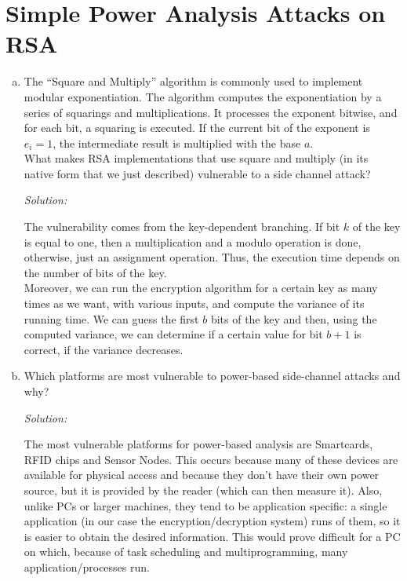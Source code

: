 \documentclass[a4paper,11pt]{article}
\newcommand{\includeonlyinsolution}[1]{\ifsolution#1\fi}
\newenvironment{solution}%
{\par{\noindent\small\textit{Solution:}}\vspace{-12pt}\begin{framed}}%
{\end{framed}\par}
\begin{document}
\section{Simple Power Analysis Attacks on RSA}
\begin{enumerate}[(a)]

\item The ``Square and Multiply'' algorithm is commonly used to implement
  modular exponentiation. The algorithm computes the exponentiation by a
  series of squarings and multiplications. It processes the exponent bitwise,
  and for each bit, a squaring is executed. If the current bit of the exponent
  is $e_i=1$, the intermediate result is multiplied with the base $a$. \\
  What makes RSA implementations that use square and multiply (in its native
  form that we just described) vulnerable to a side channel
  attack?
\includeonlyinsolution{\begin{solution}
The vulnerability comes from the key-dependent branching. If bit $k$ of the key
is equal to one, then a multiplication and a modulo operation is done, otherwise,
just an assignment operation. Thus, the execution time depends on the number of
bits of the key.\\
Moreover, we can run the encryption algorithm for a certain key as many times
as we want, with various inputs, and compute the variance of its running time.
We can guess the first $b$ bits of the key and then, using the computed variance,
we can determine if a certain value for bit $b+1$ is correct, if the variance decreases.
\end{solution}}


\item Which platforms are most vulnerable to power-based side-channel attacks and why?
\includeonlyinsolution{\begin{solution}
The most vulnerable platforms for power-based analysis are Smartcards, RFID chips
and Sensor Nodes. This occurs because many of these devices are available for physical access
and because they don't have their own power source, but it is provided by the reader (which can
then measure it). Also, unlike PCs or larger machines, they tend to be application specific: a single
application (in our case the encryption/decryption system) runs of them, so it is easier to obtain
the desired information. This would prove difficult for a PC on which, because of task scheduling
and multiprogramming, many application/processes run.

\end{solution}}
\end{enumerate}
\end{document}

